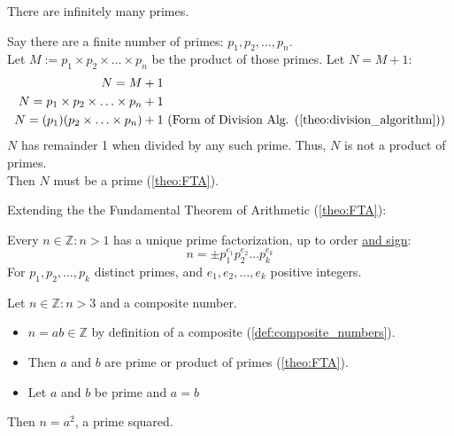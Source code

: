 \newpage

\begin{theo}

    \label{theo:euclids_theorem}
    
        There are infinitely many primes.
\end{theo}

\begin{Proof}
    Say there are a finite number of primes: $p_1,p_2,\ldots,p_n$.\\
    Let $M:=p_1\times p_2\times\ldots\times p_n$ be the product of those primes. Let $N=M+1$:
    \begin{align*}
        N = M+1&\\
        N= p_1\times p_2\times\ldots\times p_n + 1&\\
        N= (p_1)(p_2\times\ldots\times p_n) + 1&\text{ (Form of Division Alg. (\ref{theo:division_algorithm}))}\\
    \end{align*}
    $N$ has remainder 1 when divided by any such prime. Thus, $N$ is not a product of primes.\\
    Then $N$ must be a prime (\ref{theo:FTA}).
\end{Proof}

\noindent
Extending the the Fundamental Theorem of Arithmetic (\ref{theo:FTA}):
\begin{theo}

    \label{theo:FTA_corollary}

    Every $n\in\mathbb{Z}:n>1$ has a unique prime factorization, up to order \underline{and sign}:
    \[n = \pm p_1^{e_1}p_2^{e_2}\ldots p_k^{e_k}\]
    For $p_1,p_2,\ldots,p_k$ distinct primes, and $e_1,e_2,\ldots,e_k$ positive integers.
\end{theo}

\begin{Proof}

   Let $n\in\mathbb{Z}:n>3$ and a composite number.
   \begin{itemize}
    \item $n=ab\in\mathbb{Z}$ by definition of a composite (\ref{def:composite_numbers}).
    \item Then $a$ and $b$ are prime or product of primes (\ref{theo:FTA}).
    \item Let $a$ and $b$ be prime and $a=b$
   \end{itemize}
  
   \noindent
   Then $n=a^2$, a prime squared.
\end{Proof}

